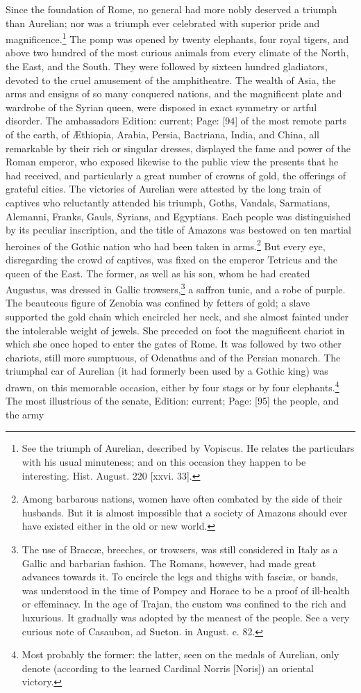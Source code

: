 Since the foundation of Rome, no general had more nobly deserved a triumph than Aurelian; nor was a triumph ever celebrated with superior pride and magnificence.\footnote{See the triumph of Aurelian, described by Vopiscus. He relates the particulars with his usual minuteness; and on this occasion they happen to be interesting. Hist. August. 220 [xxvi. 33].} The pomp was opened by twenty elephants, four royal tigers, and above two hundred of the most curious animals from every climate of the North, the East, and the South. They were followed by sixteen hundred gladiators, devoted to the cruel amusement of the amphitheatre. The wealth of Asia, the arms and ensigns of so many conquered nations, and the magnificent plate and wardrobe of the Syrian queen, were disposed in exact symmetry or artful disorder. The ambassadors Edition: current; Page: [94] of the most remote parts of the earth, of Æthiopia, Arabia, Persia, Bactriana, India, and China, all remarkable by their rich or singular dresses, displayed the fame and power of the Roman emperor, who exposed likewise to the public view the presents that he had received, and particularly a great number of crowns of gold, the offerings of grateful cities. The victories of Aurelian were attested by the long train of captives who reluctantly attended his triumph, Goths, Vandals, Sarmatians, Alemanni, Franks, Gauls, Syrians, and Egyptians. Each people was distinguished by its peculiar inscription, and the title of Amazons was bestowed on ten martial heroines of the Gothic nation who had been taken in arms.\footnote{Among barbarous nations, women have often combated by the side of their husbands. But it is almost impossible that a society of Amazons should ever have existed either in the old or new world.} But every eye, disregarding the crowd of captives, was fixed on the emperor Tetricus and the queen of the East. The former, as well as his son, whom he had created Augustus, was dressed in Gallic trowsers,\footnote{The use of Braccæ, breeches, or trowsers, was still considered in Italy as a Gallic and barbarian fashion. The Romans, however, had made great advances towards it. To encircle the legs and thighs with fasciæ, or bands, was understood in the time of Pompey and Horace to be a proof of ill-health or effeminacy. In the age of Trajan, the custom was confined to the rich and luxurious. It gradually was adopted by the meanest of the people. See a very curious note of Casaubon, ad Sueton. in August. c. 82.} a saffron tunic, and a robe of purple. The beauteous figure of Zenobia was confined by fetters of gold; a slave supported the gold chain which encircled her neck, and she almost fainted under the intolerable weight of jewels. She preceded on foot the magnificent chariot in which she once hoped to enter the gates of Rome. It was followed by two other chariots, still more sumptuous, of Odenathus and of the Persian monarch. The triumphal car of Aurelian (it had formerly been used by a Gothic king) was drawn, on this memorable occasion, either by four stags or by four elephants.\footnote{Most probably the former: the latter, seen on the medals of Aurelian, only denote (according to the learned Cardinal Norris [Noris]) an oriental victory.} The most illustrious of the senate, Edition: current; Page: [95] the people, and the army 